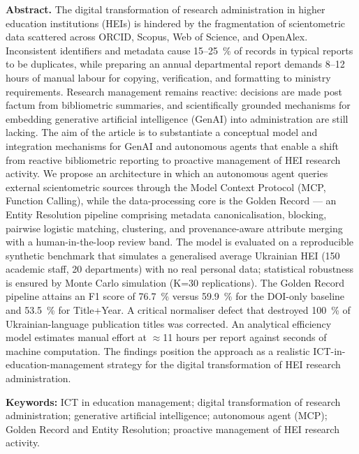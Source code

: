 \textbf{Abstract.} The digital transformation of research administration in higher education institutions (HEIs) is hindered by the fragmentation of scientometric data scattered across ORCID, Scopus, Web of Science, and OpenAlex. Inconsistent identifiers and metadata cause 15--25~\% of records in typical reports to be duplicates, while preparing an annual departmental report demands 8--12 hours of manual labour for copying, verification, and formatting to ministry requirements. Research management remains reactive: decisions are made post factum from bibliometric summaries, and scientifically grounded mechanisms for embedding generative artificial intelligence (GenAI) into administration are still lacking. The aim of the article is to substantiate a conceptual model and integration mechanisms for GenAI and autonomous agents that enable a shift from reactive bibliometric reporting to proactive management of HEI research activity. We propose an architecture in which an autonomous agent queries external scientometric sources through the Model Context Protocol (MCP, Function Calling), while the data-processing core is the Golden Record --- an Entity Resolution pipeline comprising metadata canonicalisation, blocking, pairwise logistic matching, clustering, and provenance-aware attribute merging with a human-in-the-loop review band. The model is evaluated on a reproducible synthetic benchmark that simulates a generalised average Ukrainian HEI (150 academic staff, 20 departments) with no real personal data; statistical robustness is ensured by Monte Carlo simulation (K=30 replications). The Golden Record pipeline attains an F1 score of 76.7~\% versus 59.9~\% for the DOI-only baseline and 53.5~\% for Title+Year. A critical normaliser defect that destroyed 100~\% of Ukrainian-language publication titles was corrected. An analytical efficiency model estimates manual effort at $\approx$11 hours per report against seconds of machine computation. The findings position the approach as a realistic ICT-in-education-management strategy for the digital transformation of HEI research administration.

\textbf{Keywords:} ICT in education management; digital transformation of research administration; generative artificial intelligence; autonomous agent (MCP); Golden Record and Entity Resolution; proactive management of HEI research activity.